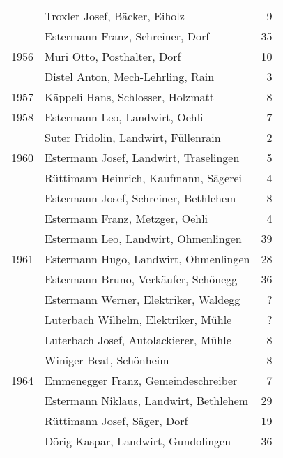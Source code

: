 {\begin{longtable}{ l l r }
                      & Troxler Josef, Bäcker, Eiholz             & 9           \\
                      & Estermann Franz, Schreiner, Dorf          & 35          \\
        1956          & Muri Otto, Posthalter, Dorf               & 10          \\
                      & Distel Anton, Mech-Lehrling, Rain         & 3           \\
        1957          & Käppeli Hans, Schlosser, Holzmatt         & 8           \\
        1958          & Estermann Leo, Landwirt, Oehli            & 7           \\
                      & Suter Fridolin, Landwirt, Füllenrain      & 2           \\
        1960          & Estermann Josef, Landwirt, Traselingen    & 5           \\
                      & Rüttimann Heinrich, Kaufmann, Sägerei     & 4           \\
                      & Estermann Josef, Schreiner, Bethlehem     & 8           \\
                      & Estermann Franz, Metzger, Oehli           & 4           \\
                      & Estermann Leo, Landwirt, Ohmenlingen      & 39          \\
        1961          & Estermann Hugo, Landwirt, Ohmenlingen     & 28          \\
                      & Estermann Bruno, Verkäufer, Schönegg      & 36          \\
                      & Estermann Werner, Elektriker, Waldegg     & ?           \\
                      & Luterbach Wilhelm, Elektriker, Mühle      & ?           \\
                      & Luterbach Josef, Autolackierer, Mühle     & 8           \\
                      & Winiger Beat, Schönheim                   & 8           \\
        1964          & Emmenegger Franz, Gemeindeschreiber       & 7           \\
                      & Estermann Niklaus, Landwirt, Bethlehem    & 29          \\
                      & Rüttimann Josef, Säger, Dorf              & 19          \\
                      & Dörig Kaspar, Landwirt, Gundolingen       & 36          \\

\end{longtable}}
